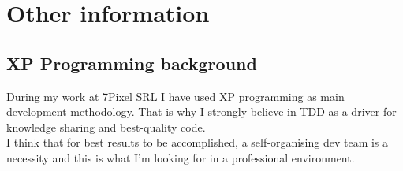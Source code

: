\documentclass[letterpaper]{twentysecondcv} %
\begin{document}

\section{Other information}

\subsection{XP Programming background}

During my work at 7Pixel SRL I have used XP programming as main development methodology. That is why I strongly believe in TDD as a driver for knowledge sharing and best-quality code. \\
I think that for best results to be accomplished, a self-organising dev team is a necessity and this is what I'm looking for in a professional environment.





\end{document}
